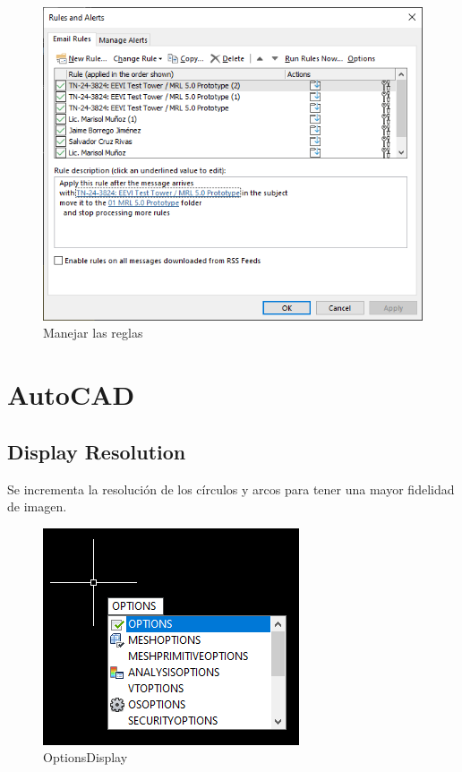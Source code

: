 \documentclass[12pt,letterpaper,final]{report}
\begin{document}
\begin{figure}[H]
	\centering
	\includegraphics[width=0.75\linewidth, height=0.35\textheight,keepaspectratio]{Imagenes/outlook_rules07}
	\caption{Manejar las reglas}
	\label{fig:outlookrules07}
\end{figure}


\part{AutoCAD}

\chapter{Display Resolution}

Se incrementa la resolución de los círculos y arcos para tener una mayor fidelidad de imagen.

\begin{figure}[H]
	\centering
	\includegraphics[width=0.75\linewidth, height=0.5\textheight,keepaspectratio]{Imagenes/autocad_display_resolution_01}
	\caption{Options\textrightarrow Display}
	\label{fig:autocaddisplayresolution01}
\end{figure}
\end{document}
